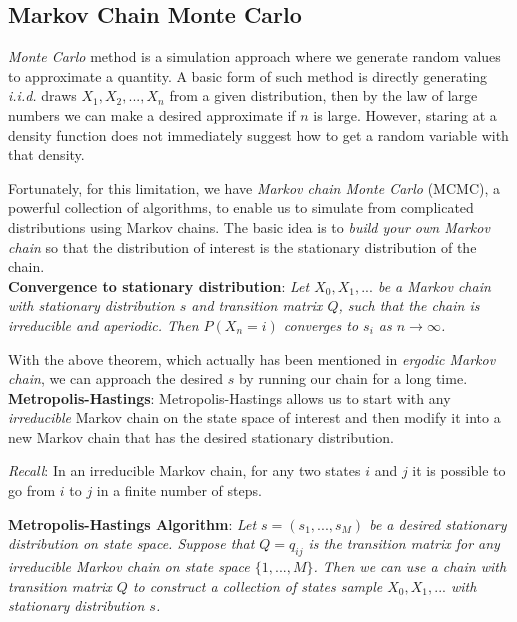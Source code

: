 \documentclass{progartcn}
\begin{document}
	\subsection{Markov Chain Monte Carlo}

		\textit{Monte Carlo} method is a simulation approach where we generate random values to approximate a quantity. A basic form of such method is directly generating \textit{i.i.d.} draws $X_1,X_2,..., X_n$ from a given distribution, then by the law of large numbers we can make a desired approximate if $n$ is large. However, staring at a density function does not immediately suggest how to get a random variable with that density.

		Fortunately, for this limitation, we have \textit{Markov chain Monte Carlo} (MCMC), a powerful collection of algorithms, to enable us to simulate from complicated distributions using Markov chains. The basic idea is to \textit{build your own Markov chain} so that the distribution of interest is the stationary distribution of the chain.\\

		\textbf{Convergence to stationary distribution}: \textit{Let $X_0, X_1,...$ be a Markov chain with stationary distribution $s$ and transition matrix $Q$, such that the chain is irreducible and aperiodic. Then $P(X_n=i)$ converges to $s_i$ as $n\to\infty$.}

		With the above theorem, which actually has been mentioned in \textit{ergodic Markov chain}, we can approach the desired $s$ by running our chain for a long time.\\

		\textbf{Metropolis-Hastings}: Metropolis-Hastings allows us to start with any \textit{irreducible} Markov chain on the state space of interest and then modify it into a new Markov chain that has the desired stationary distribution. 

		\textit{Recall}: In an irreducible Markov chain, for any two states $i$ and $j$ it is possible to go from $i$ to $j$ in a finite number of steps.

		\textbf{Metropolis-Hastings Algorithm}: \textit{Let $s=(s_1,...,s_M)$ be a desired stationary distribution on state space. Suppose that $Q=q_{ij}$ is the transition matrix for any irreducible Markov chain on state space $\{1,...,M\}$. Then we can use a chain with transition matrix $Q$ to construct a collection of states sample $X_0,X_1,...$ with stationary distribution $s$.}
\end{document}
